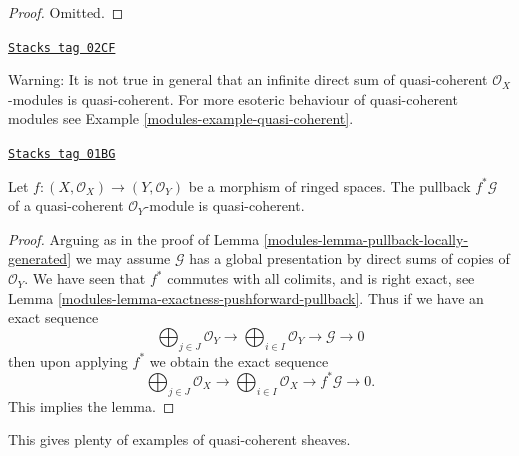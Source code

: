 \begin{proof}
Omitted.
\end{proof}

\begin{remark}
\label{modules-remark-infinite-direct-sum-quasi-coherent-not}
\href{https://stacks.math.columbia.edu/tag/02CF}{\texttt{Stacks tag 02CF}}

Warning: It is not true in general that an infinite
direct sum of quasi-coherent $\mathcal{O}_X$-modules
is quasi-coherent. For more esoteric behaviour of quasi-coherent
modules see Example \ref{modules-example-quasi-coherent}.
\end{remark}

\begin{lemma}
\label{modules-lemma-pullback-quasi-coherent}
\href{https://stacks.math.columbia.edu/tag/01BG}{\texttt{Stacks tag 01BG}}

Let $f : (X, \mathcal{O}_X) \to (Y, \mathcal{O}_Y)$
be a morphism of ringed spaces.
The pullback $f^*\mathcal{G}$ of a quasi-coherent
$\mathcal{O}_Y$-module is quasi-coherent.
\end{lemma}

\begin{proof}

Arguing as in the proof of Lemma \ref{modules-lemma-pullback-locally-generated}
we may assume $\mathcal{G}$ has a global presentation by
direct sums of copies of $\mathcal{O}_Y$.
We have seen that $f^*$ commutes with all colimits,
and is right exact, see Lemma \ref{modules-lemma-exactness-pushforward-pullback}.
Thus if we have an exact sequence
$$
\bigoplus\nolimits_{j \in J}
\mathcal{O}_Y
\longrightarrow
\bigoplus\nolimits_{i \in I}
\mathcal{O}_Y
\longrightarrow
\mathcal{G}
\longrightarrow
0
$$
then upon applying $f^*$ we obtain the exact sequence
$$
\bigoplus\nolimits_{j \in J}
\mathcal{O}_X
\longrightarrow
\bigoplus\nolimits_{i \in I}
\mathcal{O}_X
\longrightarrow
f^*\mathcal{G}
\longrightarrow
0.
$$
This implies the lemma.
\end{proof}

This gives plenty of examples of quasi-coherent sheaves.

